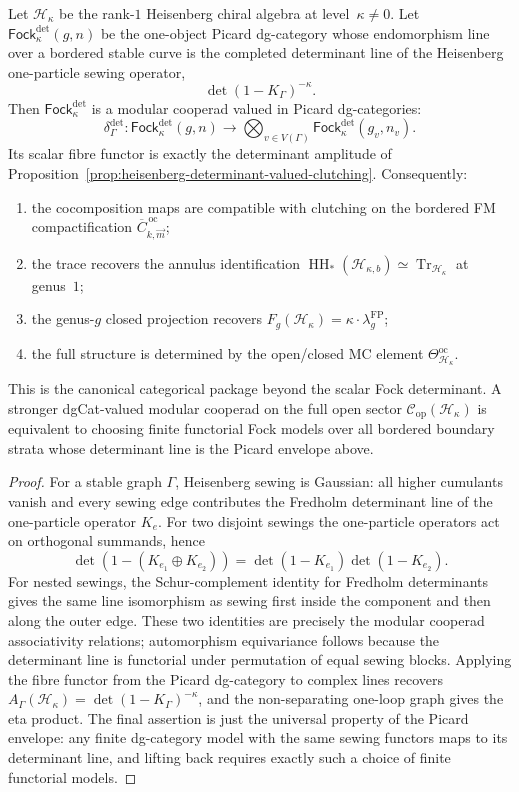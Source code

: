 \documentclass[11pt]{article}
\newcommand{\cC}{\mathcal{C}}
\newcommand{\cH}{\mathcal{H}}
\newcommand{\HH}{\operatorname{HH}}
\newcommand{\Tr}{\operatorname{Tr}}
\begin{document}
\begin{theorem}
\label{thm*:heisenberg-modular-cooperad}
Let $\cH_\kappa$ be the rank-$1$ Heisenberg chiral algebra
at level~$\kappa \neq 0$.  Let
$\mathsf{Fock}_{\kappa}^{\det}(g,n)$ be the one-object Picard
dg-category whose endomorphism line over a bordered stable curve
is the completed determinant line of the Heisenberg one-particle
sewing operator,
\[
  \det(1-K_\Gamma)^{-\kappa}.
\]
Then $\mathsf{Fock}_{\kappa}^{\det}$ is a modular cooperad valued
in Picard dg-categories:
\[
  \delta_{\Gamma}^{\det}\colon
  \mathsf{Fock}_{\kappa}^{\det}(g,n)
  \longrightarrow
  \bigotimes_{v\in V(\Gamma)}
  \mathsf{Fock}_{\kappa}^{\det}(g_v,n_v).
\]
Its scalar fibre functor is exactly the determinant amplitude of
Proposition~\ref{prop:heisenberg-determinant-valued-clutching}.
Consequently:
\begin{enumerate}[label=\textup{(\alph*)},nosep]
\item the cocomposition maps are compatible with
  clutching on the bordered FM compactification
  $\overline{C}^{\,\mathrm{oc}}_{k,\vec{m}}$;
\item the trace recovers the annulus identification
  $\HH_*(\cH_{\kappa,b}) \simeq \Tr_{\cH_\kappa}$
  at genus~$1$;
\item the genus-$g$ closed projection recovers
  $F_g(\cH_\kappa) = \kappa \cdot \lambda_g^{\mathrm{FP}}$;
\item the full structure is determined by the open/closed
  MC element $\Theta^{\mathrm{oc}}_{\cH_\kappa}$.
\end{enumerate}
This is the canonical categorical package beyond the scalar
Fock determinant.  A stronger dgCat-valued modular cooperad on
the full open sector $\cC_{\mathrm{op}}(\cH_\kappa)$ is equivalent
to choosing finite functorial Fock models over all bordered
boundary strata whose determinant line is the Picard envelope
above.
\end{theorem}

\begin{proof}
For a stable graph $\Gamma$, Heisenberg sewing is Gaussian:
all higher cumulants vanish and every sewing edge contributes the
Fredholm determinant line of the one-particle operator $K_e$.
For two disjoint sewings the one-particle operators act on
orthogonal summands, hence
\[
  \det(1-(K_{e_1}\oplus K_{e_2}))
  =
  \det(1-K_{e_1})\det(1-K_{e_2}).
\]
For nested sewings, the Schur-complement identity for Fredholm
determinants gives the same line isomorphism as sewing first
inside the component and then along the outer edge.  These two
identities are precisely the modular cooperad associativity
relations; automorphism equivariance follows because the
determinant line is functorial under permutation of equal sewing
blocks.  Applying the fibre functor from the Picard dg-category
to complex lines recovers
$A_\Gamma(\cH_\kappa)=\det(1-K_\Gamma)^{-\kappa}$, and the
non-separating one-loop graph gives the eta product.  The final
assertion is just the universal property of the Picard envelope:
any finite dg-category model with the same sewing functors maps
to its determinant line, and lifting back requires exactly such a
choice of finite functorial models.
\end{proof}
\end{document}
